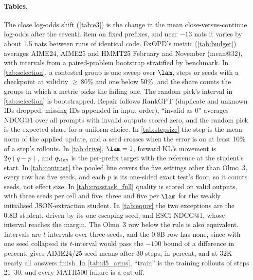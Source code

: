 \paragraph{Tables.}
The close log-odds shift (\cref{tab:e3}) is the change in the mean close-versus-continue log-odds after the seventh item on fixed prefixes, and near $-13$ nats it varies by about 1.5 nats between runs of identical code.
ExOPD's metric (\cref{tab:budget}) averages AIME24, AIME25 and HMMT25 February and November (mean@32), with intervals from a paired-problem bootstrap stratified by benchmark.
In \cref{tab:selection}, a contested group is one sweep over $\lam$, steps or seeds with a checkpoint at validity ${\geq}\,80\%$ and one below 50\%, and the share counts the groups in which a metric picks the failing one. The random pick's interval in \cref{tab:selection} is bootstrapped.
Repair follows RankGPT (duplicate and unknown IDs dropped, missing IDs appended in input order), ``invalid as 0'' averages NDCG@1 over all prompts with invalid outputs scored zero, and the random pick is the expected share for a uniform choice.
In \cref{tab:stepsize} the step is the mean norm of the applied update, and a seed crosses when the error is on at least 10\% of a step's rollouts.
In \cref{tab:drive}, $\lam=1$, forward KL's movement is $2\eta(q-p)$, and $q_\lam$ is the per-prefix target with the reference at the student's start.
In \cref{tab:contrast} the pooled line covers the five settings other than Olmo~3, every row has five seeds, and each $p$ is its one-sided exact test's floor, so it counts seeds, not effect size.
In \cref{tab:crosstask_full} quality is scored on valid outputs, with three seeds per cell and five, three and five per $\lam$ for the weakly initialised JSON-extraction student.
In \cref{tab:equiv} the two exceptions are the 0.8B student, driven by its one escaping seed, and ESCI NDCG@1, whose interval reaches the margin. The Olmo~3 row below the rule is also equivalent. Intervals are $t$-intervals over three seeds, and the 0.8B row has none, since with one seed collapsed its $t$-interval would pass the $-100$ bound of a difference in percent.
 gives AIME24/25 seed means after 30 steps, in percent, and at 32K nearly all answers finish. In \cref{tab:d5_arms}, ``train'' is the training rollouts of steps 21--30, and every MATH500 failure is a cut-off.

